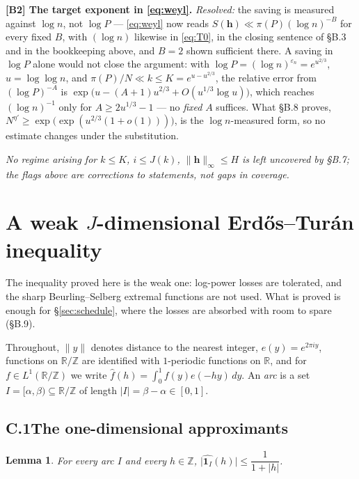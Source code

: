 \documentclass[11pt]{article}
\newtheorem{lemma}[theorem]{Lemma}
\theoremstyle{definition}
\theoremstyle{plain}
\begin{document}
\textbf{[B2] The target exponent in \eqref{eq:weyl}.}
\emph{Resolved:} the saving is measured against $\log n$, not $\log P$
--- \eqref{eq:weyl} now reads $S(\mathbf h)\ll\pi(P)(\log n)^{-B}$ for
every fixed $B$, with $(\log n)$ likewise in \eqref{eq:T0}, in the
closing sentence of \S B.3 and in the bookkeeping above, and $B=2$ shown
sufficient there.  A saving in $\log P$ alone would not close the
argument: with $\log P=(\log n)^{\varepsilon_{n}}=e^{u^{2/3}}$,
$u=\log\log n$, and $\pi(P)/N\ll k\le K=e^{u-u^{2/3}}$, the relative
error from $(\log P)^{-A}$ is
$\exp\bigl(u-(A+1)u^{2/3}+O(u^{1/3}\log u)\bigr)$, which reaches
$(\log n)^{-1}$ only for $A\ge2u^{1/3}-1$ --- no \emph{fixed} $A$
suffices.  What \S B.8 proves,
$N^{\eta'}\ge\exp\bigl(\exp(u^{2/3}(1+o(1)))\bigr)$, is the
$\log n$-measured form, so no estimate changes under the substitution.

\emph{No regime arising for $k\le K$, $i\le J(k)$, $\|\mathbf h\|_\infty\le
H$ is left uncovered by \S B.7; the flags above are corrections to
statements, not gaps in coverage.}

\section{A weak $J$-dimensional Erd\H{o}s--Tur\'an inequality}\label{app:ET}

The inequality proved here is the weak one: log-power losses are
tolerated, and the sharp Beurling--Selberg extremal functions are not
used.  What is proved is enough for \S\ref{sec:schedule}, where the
losses are absorbed with room to spare (\S B.9).

Throughout, $\|y\|$ denotes distance to the nearest integer,
$e(y)=e^{2\pi iy}$, functions on $\mathbb R/\mathbb Z$ are identified with
$1$-periodic functions on $\mathbb R$, and for $f\in L^{1}(\mathbb
R/\mathbb Z)$ we write $\hat f(h)=\int_{0}^{1}f(y)e(-hy)\,dy$.  An
\emph{arc} is a set $I=[\alpha,\beta)\subseteq\mathbb R/\mathbb Z$ of
length $|I|=\beta-\alpha\in[0,1]$.

\subsection*{C.1\quad The one-dimensional approximants}

\begin{lemma}\label{lem:fourier1}
For every arc $I$ and every $h\in\mathbb Z$,
$\bigl|\widehat{\mathbf 1_{I}}(h)\bigr|\le\dfrac{1}{1+|h|}$.
\end{lemma}
\end{document}
